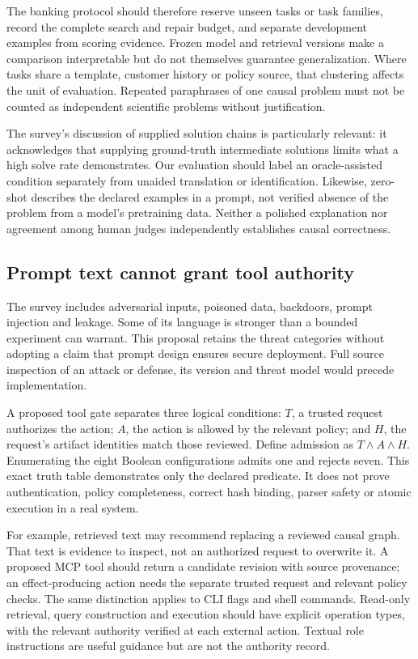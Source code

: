 The banking protocol should therefore reserve unseen tasks or task families,
record the complete search and repair budget, and separate development examples
from scoring evidence. Frozen model and retrieval versions make a comparison
interpretable but do not themselves guarantee generalization. Where tasks share
a template, customer history or policy source, that clustering affects the unit
of evaluation. Repeated paraphrases of one causal problem must not be counted
as independent scientific problems without justification.

The survey's discussion of supplied solution chains is particularly relevant:
it acknowledges that supplying ground-truth intermediate solutions limits what
a high solve rate demonstrates. Our evaluation should label an oracle-assisted
condition separately from unaided translation or identification. Likewise,
zero-shot describes the declared examples in a prompt, not verified absence of
the problem from a model's pretraining data. Neither a polished explanation nor
agreement among human judges independently establishes causal correctness.
\citep{exec24_promptengineering_original}

\subsection{Prompt text cannot grant tool authority}

The survey includes adversarial inputs, poisoned data, backdoors, prompt injection
and leakage. Some of its language is stronger than a bounded experiment can
warrant. This proposal retains the threat categories without adopting a claim
that prompt design ensures secure deployment. Full source inspection of an
attack or defense, its version and threat model would precede implementation.
\citep{exec24_promptengineering_original}

A proposed tool gate separates three logical conditions: $T$, a trusted request
authorizes the action; $A$, the action is allowed by the relevant policy; and
$H$, the request's artifact identities match those reviewed. Define admission
as $T\land A\land H$. Enumerating the eight Boolean configurations admits one
and rejects seven. This exact truth table demonstrates only the declared
predicate. It does not prove authentication, policy completeness, correct hash
binding, parser safety or atomic execution in a real system.
\citep{exec24_promptengineering_reference}

For example, retrieved text may recommend replacing a reviewed causal graph.
That text is evidence to inspect, not an authorized request to overwrite it.
A proposed MCP tool should return a candidate revision with source provenance;
an effect-producing action needs the separate trusted request and relevant
policy checks. The same distinction applies to CLI flags and shell commands.
Read-only retrieval, query construction and execution should have explicit
operation types, with the relevant authority verified at each external action.
Textual role instructions are useful guidance but are not the authority record.

